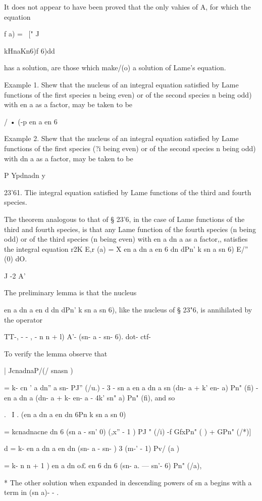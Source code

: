 {{{{{{{It does not appear to have been proved that the only vahies of A, for
which the equation

f a) = \ [" J\ \ {kHnaKn6)f 6)dd

has a solution, are those which make/(o) a solution of Lame's
equation.

Example 1. Shew that the nucleus of an integral equation satisfied by
Lame functions of the first species n being even) or of the second
species n being odd) with en a as a factor, may be taken to be

/ • (-p en a en 6

Example 2. Shew that the nucleus of an integral equation satisfied by
Lame functions of the first species (?i being even) or of the second
species n being odd) with dn a as a factor, may be taken to be

P Ypdnadn y

23'61. Tlie integral equation satisfied by Lame functions of the third
and fourth species.

The theorem analogous to that of § 23'6, in the case of Lame functions
of the third and fourth species, is that any Lame function of the
fourth species (n being odd) or of the third species (n being even)
with en a dn a as a factor,, satisfies the integral equation r2K E,r
(a) = X en a dn a en 6 dn dPn' k sn a sn 6) E/'' (0) dO.

J -2 A'

The preliminary lemma is that the nucleus

en a dn a en d dn dPn' k sn a sn 6), like the nucleus of § 23"6, is
annihilated by the operator

TT-, - - , - n n + l) A'- (sn- a - sn- 6). dot- ctf-

To verify the lemma observe that

| JcnadnaP/(/ snasn )

= k- cn ' a dn'' a sn- PJ'' (/u.) - 3 - sn a en a dn a sn (dn- a + k'
en- a) Pn" (fi) - en a dn a (dn- a + k- en- a - 4k' sn" a) Pn" (fi),
and so

. \ I . (en a dn a en dn 6Pn k sn a sn 0)\

= kcnadnacne dn 6 (sn a - sn' 0) (,x'' - 1 ) PJ " (/i) -f GfxPn" ( ) +
GPn" (/*)]

d = k- en a dn a en dn (sn- a - sn- ) 3 (m-' - 1) Pv/ (a )

= k- n n + 1 ) en a dn o£ en 6 dn 6 (sn- a. — sn'- 6) Pn" (/a),

* The other solution when expanded in descending powers of sn a begins
with a term in (sn a)- - .



}}}}}}}}
